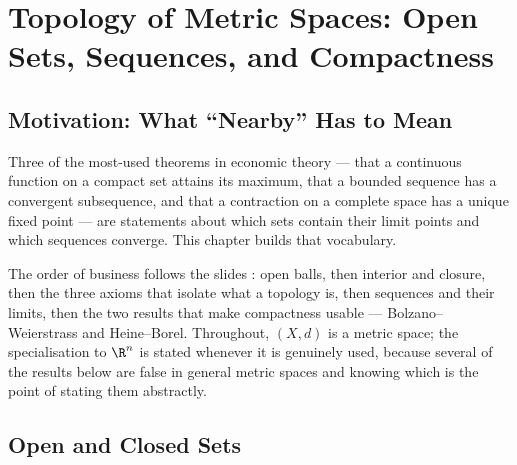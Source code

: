 
\chapter[Topology of Metric Spaces]{Topology of Metric Spaces: Open Sets, Sequences, and Compactness}
\label{ch:topology}

\section{Motivation: What ``Nearby'' Has to Mean}\label{sec:top-motivation}

Three of the most-used theorems in economic theory --- that a continuous function
on a compact set attains its maximum, that a bounded sequence has a convergent
subsequence, and that a contraction on a complete space has a unique fixed point
--- are statements about which sets contain their limit points and which
sequences converge. This chapter builds that vocabulary.

The order of business follows the slides
\autocite[slides 26--48]{fukuda2026analysis}: open balls, then interior and
closure, then the three axioms that isolate what a topology is, then sequences
and their limits, then the two results that make compactness usable ---
Bolzano--Weierstrass and Heine--Borel. Throughout, $(X,d)$ is a metric space; the
specialisation to $\R^n$ is stated whenever it is genuinely used, because several
of the results below are false in general metric spaces and knowing which is the
point of stating them abstractly.

\section{Open and Closed Sets}\label{sec:top-openclosed}

